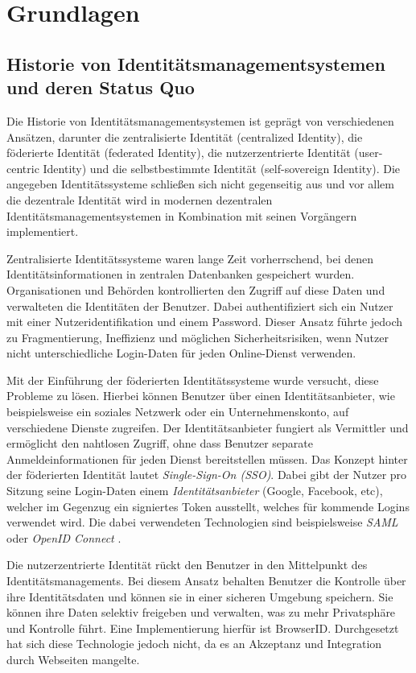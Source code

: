 \chapter{Grundlagen}
\label{cha:grundlagen}

\section{Historie von Identitätsmanagementsystemen und deren Status Quo}
Die Historie von Identitätsmanagementsystemen ist geprägt von verschiedenen Ansätzen, darunter die zentralisierte Identität (centralized Identity), die föderierte Identität (federated Identity), die nutzerzentrierte Identität (user-centric Identity) und die selbstbestimmte Identität (self-sovereign Identity). Die angegeben Identitätssysteme schließen sich nicht gegenseitig aus und vor allem die dezentrale Identität wird in modernen dezentralen Identitätsmanagementsystemen in Kombination mit seinen Vorgängern implementiert.

Zentralisierte Identitätssysteme waren lange Zeit vorherrschend, bei denen Identitätsinformationen in zentralen Datenbanken gespeichert wurden. Organisationen und Behörden kontrollierten den Zugriff auf diese Daten und verwalteten die Identitäten der Benutzer. Dabei authentifiziert sich ein Nutzer mit einer Nutzeridentifikation und einem Password.  Dieser Ansatz führte jedoch zu Fragmentierung, Ineffizienz und möglichen Sicherheitsrisiken, wenn Nutzer nicht unterschiedliche Login-Daten für jeden Online-Dienst verwenden.

Mit der Einführung der föderierten Identitätssysteme wurde versucht, diese Probleme zu lösen. Hierbei können Benutzer über einen Identitätsanbieter, wie beispielsweise ein soziales Netzwerk oder ein Unternehmenskonto, auf verschiedene Dienste zugreifen. Der Identitätsanbieter fungiert als Vermittler und ermöglicht den nahtlosen Zugriff, ohne dass Benutzer separate Anmeldeinformationen für jeden Dienst bereitstellen müssen. Das Konzept hinter der föderierten Identität lautet \textsl{Single-Sign-On (SSO)}. Dabei gibt der Nutzer pro Sitzung seine Login-Daten einem \textsl{Identitätsanbieter} (Google, Facebook, etc), welcher im Gegenzug ein signiertes Token ausstellt, welches für kommende Logins verwendet wird. Die dabei verwendeten Technologien sind beispielsweise \textsl{SAML} \cite{ID12} oder \textsl{OpenID Connect} \cite{ID13}.

Die nutzerzentrierte Identität rückt den Benutzer in den Mittelpunkt des Identitätsmanagements. Bei diesem Ansatz behalten Benutzer die Kontrolle über ihre Identitätsdaten und können sie in einer sicheren Umgebung speichern. Sie können ihre Daten selektiv freigeben und verwalten, was zu mehr Privatsphäre und Kontrolle führt. Eine Implementierung hierfür ist BrowserID\cite{ID14}. Durchgesetzt hat sich diese Technologie jedoch nicht, da es an Akzeptanz und Integration durch Webseiten mangelte.

